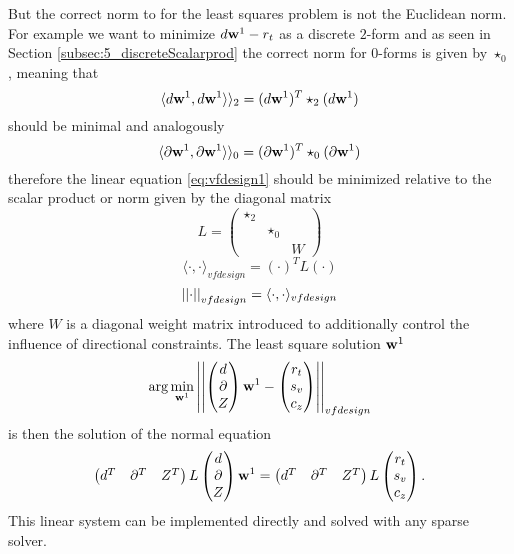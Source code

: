 But the correct norm to for the least squares problem is not the Euclidean norm. For example we want to minimize $d\textbf{w}^1-r_t$ as a discrete $2$-form and as seen in Section \ref{subsec:5_discreteScalarprod} the correct norm for $0$-forms is given by $\star_0$, meaning that
\[\langle d\textbf{w}^1, d\textbf{w}^1\rangle \rangle_2 = (d\textbf{w}^1)^T \star_2 (d\textbf{w}^1)
\]
should be minimal and analogously
\[\langle \partial \textbf{w}^1, \partial\textbf{w}^1\rangle \rangle_0 = (\partial\textbf{w}^1)^T \star_0 (\partial\textbf{w}^1)\]
therefore the linear equation \ref{eq:vfdesign1}
should be minimized relative to the scalar product or norm given by the diagonal matrix
\[L = \begin{pmatrix}
\star_2 & & \\
 & \star_0 & \\
 & & W
\end{pmatrix}\]
\[\langle \cdot , \cdot\rangle_{vfdesign} = (\cdot)^T L (\cdot)\]
\[\left| \left|  \cdot \right| \right|_{vfdesign} = \langle \cdot,\cdot \rangle_{vfdesign}\]
where $W$ is a diagonal weight matrix introduced to additionally control the influence of directional constraints. The least square solution $\textbf{w}^1$ 
\[\arg\min_{\textbf{w}^1}\left| \left| \begin{pmatrix} d \\
\partial \\
Z
\end{pmatrix} 
\textbf{w}^1 - \begin{pmatrix}
r_t \\
s_v \\
c_z
\end{pmatrix} \right| \right|_{vfdesign}\]
is then the solution of the normal equation 
\begin{equation}\begin{pmatrix} d^T & \partial^T & Z^T \end{pmatrix} L \begin{pmatrix} d \\
\partial \\
Z
\end{pmatrix} \textbf{w}^1= \begin{pmatrix} d^T & \partial^T & Z^T \end{pmatrix} L \begin{pmatrix}
r_t \\
s_v \\
c_z
\end{pmatrix}. \label{eq:vfdesignLQ}\end{equation}
This linear system can be implemented directly and solved with any sparse solver.


